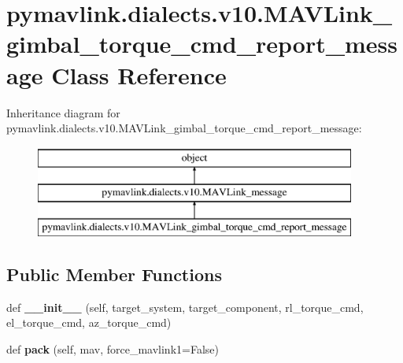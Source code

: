 \hypertarget{classpymavlink_1_1dialects_1_1v10_1_1MAVLink__gimbal__torque__cmd__report__message}{}\section{pymavlink.\+dialects.\+v10.\+M\+A\+V\+Link\+\_\+gimbal\+\_\+torque\+\_\+cmd\+\_\+report\+\_\+message Class Reference}
\label{classpymavlink_1_1dialects_1_1v10_1_1MAVLink__gimbal__torque__cmd__report__message}
Inheritance diagram for pymavlink.\+dialects.\+v10.\+M\+A\+V\+Link\+\_\+gimbal\+\_\+torque\+\_\+cmd\+\_\+report\+\_\+message\+:\begin{figure}[H]
\begin{center}
\leavevmode
\includegraphics[height=3.000000cm]{classpymavlink_1_1dialects_1_1v10_1_1MAVLink__gimbal__torque__cmd__report__message}
\end{center}
\end{figure}
\subsection*{Public Member Functions}
\begin{DoxyCompactItemize}
\item 
\mbox{\label{classpymavlink_1_1dialects_1_1v10_1_1MAVLink__gimbal__torque__cmd__report__message_adf146713992c7fa23b09afd0e65eeb5c}} 
def {\bfseries \+\_\+\+\_\+init\+\_\+\+\_\+} (self, target\+\_\+system, target\+\_\+component, rl\+\_\+torque\+\_\+cmd, el\+\_\+torque\+\_\+cmd, az\+\_\+torque\+\_\+cmd)
\item 
\mbox{\label{classpymavlink_1_1dialects_1_1v10_1_1MAVLink__gimbal__torque__cmd__report__message_a8146c029785700a9a0ea157591019677}} 
def {\bfseries pack} (self, mav, force\+\_\+mavlink1=False)
\end{DoxyCompactItemize}
